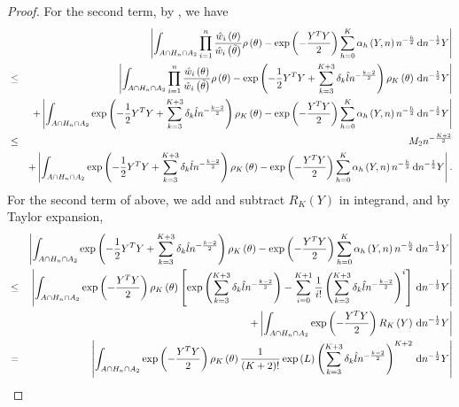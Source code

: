 \begin{proof}
For the second term, by , we
have 
\begin{eqnarray*}
 &  & \left|\int_{A\cap H_{n}\cap A_{2}}\prod_{i=1}^{n}\frac{\hat{w}_{i}\left(\theta\right)}{\hat{w}_{i}\left(\tilde{\theta}\right)}\rho\left(\theta\right)-\exp\left(-\frac{Y^{T}Y}{2}\right)\sum_{h=0}^{K}\alpha_{h}\left(Y,n\right)n^{-\frac{h}{2}}\,\mathrm{d} n^{-\frac{1}{2}}Y\right|\\
 & \le & \left|\int_{A\cap H_{n}\cap A_{2}}\prod_{i=1}^{n}\frac{\hat{w}_{i}\left(\theta\right)}{\hat{w}_{i}\left(\tilde{\theta}\right)}\rho\left(\theta\right)-\exp\left(-\frac{1}{2}Y^{T}Y+\sum_{k=3}^{K+3}\delta_{k}\hat{l}n^{-\frac{k-2}{2}}\right)\rho_{K}\left(\theta\right)\,\mathrm{d} n^{-\frac{1}{2}}Y\right|\\
 &  & +\left|\int_{A\cap H_{n}\cap A_{2}}\exp\left(-\frac{1}{2}Y^{T}Y+\sum_{k=3}^{K+3}\delta_{k}\hat{l}n^{-\frac{k-2}{2}}\right)\rho_{K}\left(\theta\right)-\exp\left(-\frac{Y^{T}Y}{2}\right)\sum_{h=0}^{K}\alpha_{h}\left(Y,n\right)n^{-\frac{h}{2}}\,\mathrm{d} n^{-\frac{1}{2}}Y\right|\\
 & \le & M_{2}n^{-\frac{K+2}{2}}\\
 &  & +\left|\int_{A\cap H_{n}\cap A_{2}}\exp\left(-\frac{1}{2}Y^{T}Y+\sum_{k=3}^{K+3}\delta_{k}\hat{l}n^{-\frac{k-2}{2}}\right)\rho_{K}\left(\theta\right)-\exp\left(-\frac{Y^{T}Y}{2}\right)\sum_{h=0}^{K}\alpha_{h}\left(Y,n\right)n^{-\frac{h}{2}}\,\mathrm{d} n^{-\frac{1}{2}}Y\right|.
\end{eqnarray*}
For the second term of above, we add and subtract $R_{K}\left(Y\right)$
in integrand, and by Taylor expansion, 
\begin{eqnarray*}
 &  & \left|\int_{A\cap H_{n}\cap A_{2}}\exp\left(-\frac{1}{2}Y^{T}Y+\sum_{k=3}^{K+3}\delta_{k}\hat{l}n^{-\frac{k-2}{2}}\right)\rho_{K}\left(\theta\right)-\exp\left(-\frac{Y^{T}Y}{2}\right)\sum_{h=0}^{K}\alpha_{h}\left(Y,n\right)n^{-\frac{h}{2}}\diff n^{-\frac{1}{2}}Y\right|\\
 & \le & \left|\int_{A\cap H_{n}\cap A_{2}}\exp\left(-\frac{Y^{T}Y}{2}\right)\rho_{K}\left(\theta\right)\left[\exp\left(\sum_{k=3}^{K+3}\delta_{k}\hat{l}n^{-\frac{k-2}{2}}\right)-\sum_{i=0}^{K+1}\frac{1}{i!}\left(\sum_{k=3}^{K+3}\delta_{k}\hat{l}n^{-\frac{k-2}{2}}\right)^{i}\right]\diff n^{-\frac{1}{2}}Y\right|\\
 &  & +\left|\int_{A\cap H_{n}\cap A_{2}}\exp\left(-\frac{Y^{T}Y}{2}\right)R_{K}\left(Y\right)\diff n^{-\frac{1}{2}}Y\right|\\
 & = & \left|\int_{A\cap H_{n}\cap A_{2}}\exp\left(-\frac{Y^{T}Y}{2}\right)\rho_{K}\left(\theta\right)\frac{1}{\left(K+2\right)!}\exp\left(L\right)\left(\sum_{k=3}^{K+3}\delta_{k}\hat{l}n^{-\frac{k-2}{2}}\right)^{K+2}\diff n^{-\frac{1}{2}}Y\right|\\

\end{eqnarray*}
\end{proof}
